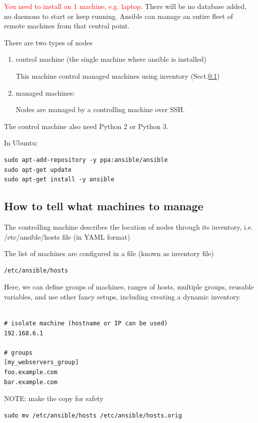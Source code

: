 \textcolor{red}{You need to install on 1 machine, e.g. laptop}.
There will be no database added, no daemons to start or keep running.
Ansible can manage an entire fleet of remote machines from that central point.

There are two types of nodes
\begin{enumerate}
  \item control machine (the single machine where ansible is installed)
  
  This machine control managed machines using inventory
  (Sect.\ref{sec:ansible-inventory})
  
  \item managed machines:
  
   Nodes are managed by a controlling machine over SSH.
\end{enumerate}

The control machine also need Python 2 or Python 3.

In Ubuntu:
\begin{verbatim}
sudo apt-add-repository -y ppa:ansible/ansible
sudo apt-get update
sudo apt-get install -y ansible
\end{verbatim}
  

\subsection{How to tell what machines to manage}
\label{sec:ansible-inventory}


The controlling machine describes the location of nodes through its inventory,
i.e. /etc/ansible/hosts file (in YAML format)

The list of machines are configured in a file (known as inventory file)  
\begin{verbatim}
/etc/ansible/hosts
\end{verbatim}  
Here, we can define groups of machines, ranges of hosts, multiple groups,
reusable variables, and use other fancy setups, including creating a dynamic inventory.

\begin{verbatim}

# isolate machine (hostname or IP can be used)
192.168.6.1

# groups
[my_webservers_group]
foo.example.com
bar.example.com

\end{verbatim}


NOTE: make the copy for safety
\begin{verbatim}
sudo mv /etc/ansible/hosts /etc/ansible/hosts.orig
\end{verbatim}



